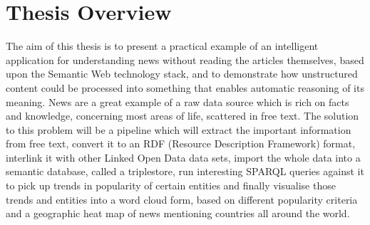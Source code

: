 \section{Thesis Overview}
The aim of this thesis is to present a practical example of an intelligent application for understanding news without reading the articles themselves, based upon the Semantic Web technology stack, and to demonstrate how unstructured content could be processed into something that enables automatic reasoning of its meaning. News are a great example of a raw data source which is rich on facts and knowledge, concerning most areas of life, scattered in free text. The solution to this problem will be a pipeline which will extract the important information from free text, convert it to an RDF (Resource Description Framework) format, interlink it with other Linked Open Data data sets, import the whole data into a semantic database, called a triplestore, run interesting SPARQL queries against it to pick up trends in popularity of certain entities and finally visualise those trends and entities into a word cloud form, based on different popularity criteria and a geographic heat map of news mentioning countries all around the world. 






